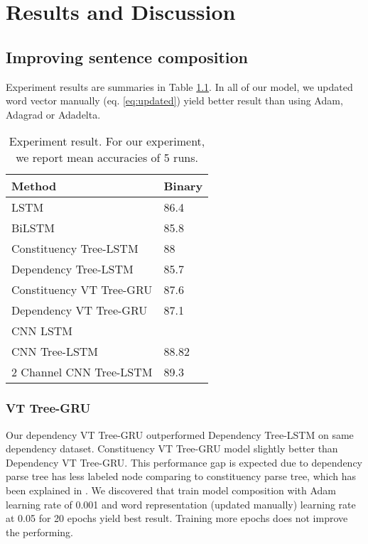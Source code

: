 \chapter{Results and Discussion}


\section{Improving sentence composition}
Experiment results are summaries in Table \ref{table:experimentresult}. In all of our model, we updated word vector manually (eq. \ref{eq:updated}) yield better result than using Adam, Adagrad or Adadelta. 

\begin{table}[H]
	\centering
	\caption{Experiment result. For our experiment, we report mean accuracies of 5 runs.}
	\label{table:experimentresult}
	\begin{tabular}{ll}
		Method                                   & Binary \\ \hline
		LSTM                                     & 86.4   \\
		BiLSTM                                   & 85.8   \\ \hline
		Constituency Tree-LSTM \cite{treeLSTM} & 88     \\
		Dependency Tree-LSTM  \cite{treeLSTM}  & 85.7   \\ \hline
		Constituency VT Tree-GRU                 & 87.6   \\
		Dependency VT Tree-GRU                   & 87.1   \\ \hline
		CNN LSTM								&         \\
		CNN Tree-LSTM                            & 88.82  \\
		2 Channel CNN Tree-LSTM  				& 89.3 
	\end{tabular}
\end{table}

\subsection{VT Tree-GRU}
Our dependency VT Tree-GRU outperformed Dependency Tree-LSTM on same dependency dataset. Constituency VT Tree-GRU model slightly better than Dependency VT Tree-GRU. This performance gap is expected due to dependency parse tree has less labeled node comparing to constituency parse tree, which has been explained in \cite{treeLSTM}. We discovered that train model composition with Adam learning rate of 0.001 and word representation (updated manually) learning rate at 0.05 for 20 epochs yield best result. Training more epochs does not improve the performing.


